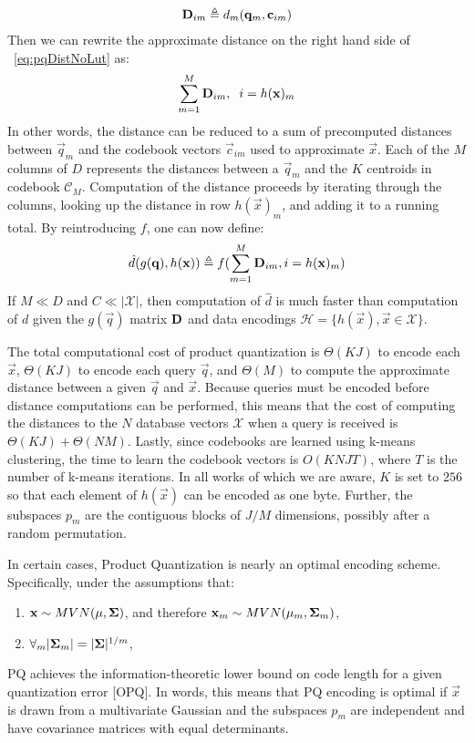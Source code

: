 \begin{align}
    \mathbf{D}_{im} \triangleq d_m(\mathbf{q}_m, \mathbf{c}_{im})
\end{align}
Then we can rewrite the approximate distance on the right hand side of ~\ref{eq:pqDistNoLut} as:
\begin{align} \label{eq:pqDist}
        \sum_{m=1}^M \mathbf{D}_{im}, \hspace{2mm} i = h(\mathbf{x})_m
\end{align}
In other words, the distance can be reduced to a sum of precomputed distances between $\vec{q}_m$ and the codebook vectors $\vec{c}_{im}$ used to approximate $\vec{x}$. Each of the $M$ columns of $D$ represents the distances between a $\vec{q}_m$ and the $K$ centroids in codebook $\mathcal{C}_M$. Computation of the distance proceeds by iterating through the columns, looking up the distance in row $h(\vec{x})_m$, and adding it to a running total. By reintroducing $f$, one can now define:
\begin{align} \label{eq:pq_dhat}
    \hat{d}(g(\mathbf{q}), h(\mathbf{x})) \triangleq f(\sum_{m=1}^M \mathbf{D}_{im}, i = h(\mathbf{x})_m)
\end{align}
If $M \ll D$ and $C \ll |\mathcal{X}|$, then computation of $\hat{d}$ is much faster than computation of $d$ given the $g(\vec{q})$ matrix $\mathbf{D}$ and data encodings $\mathcal{H} = \{h(\vec{x}), \vec{x} \in \mathcal{X} \}$.

The total computational cost of product quantization is $\Theta(KJ)$ to encode each $\vec{x}$, $\Theta(KJ)$ to encode each query $\vec{q}$, and $\Theta(M)$ to compute the approximate distance between a given $\vec{q}$ and $\vec{x}$. Because queries must be encoded before distance computations can be performed, this means that the cost of computing the distances to the $N$ database vectors $\mathcal{X}$ when a query is received is $\Theta(KJ) + \Theta(NM)$. Lastly, since codebooks are learned using k-means clustering, the time to learn the codebook vectors is $O(KNJT)$, where $T$ is the number of k-means iterations. In all works of which we are aware, $K$ is set to $256$ so that each element of $h(\vec{x})$ can be encoded as one byte. Further, the subspaces $p_m$ are the contiguous blocks of $J/M$ dimensions, possibly after a random permutation.

In certain cases, Product Quantization is nearly an optimal encoding scheme. Specifically, under the assumptions that:
\begin{enumerate}
\item $\mathbf{x} \sim MVN(\mathbf{\mu}, \mathbf{\Sigma})$, and therefore $\mathbf{x}_m \sim MVN(\mathbf{\mu}_m, \mathbf{\Sigma}_m)$,
\item $\forall_m |\mathbf{\Sigma}_m| = |\mathbf{\Sigma}|^{1/m}$,
\end{enumerate}
PQ achieves the information-theoretic lower bound on code length for a given quantization error [OPQ]. In words, this means that PQ encoding is optimal if $\vec{x}$ is drawn from a multivariate Gaussian and the subspaces $p_m$ are independent and have covariance matrices with equal determinants.

